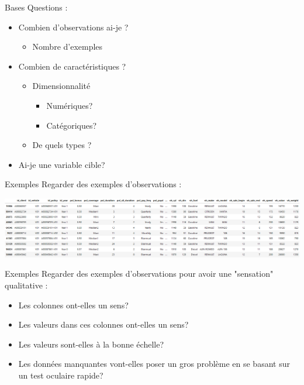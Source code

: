 \documentclass[french]{beamer}
\begin{document}
\begin{frame}{Bases}
Questions : 
\begin{itemize}
	\item Combien d'observations ai-je ?
	\begin{itemize}
		\item Nombre d'exemples
	\end{itemize}
	\item Combien de caractéristiques ?
	\begin{itemize}
		\item Dimensionnalité 
		\begin{itemize}
			\item Numériques? 
			\item Catégoriques? 
		\end{itemize}			
		\item De quels types ? 
	\end{itemize}
	\item Ai-je une variable cible?
\end{itemize}
\end{frame}

\begin{frame}{Exemples}
Regarder des exemples d'observations :
\begin{center}
	\includegraphics[height=0.8\textheight]{data_sample}
\end{center}
\end{frame}

\begin{frame}{Exemples}
Regarder des exemples d'observations pour avoir une "sensation" qualitative :
\begin{itemize}
	\item Les colonnes ont-elles un sens?
	\item Les valeurs dans ces colonnes ont-elles un sens?
	\item Les valeurs sont-elles à la bonne échelle?
	\item Les données manquantes vont-elles poser un gros problème en se basant sur un test oculaire rapide?
\end{itemize}
\end{frame}
\end{document}
